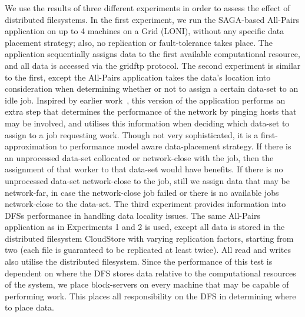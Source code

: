 \documentclass[a4paper,11pt]{article}
\begin{document}
We use the results of three different experiments in order to assess the effect of distributed filesystems. In the first experiment, we run the SAGA-based All-Pairs application on up to 4 machines on a Grid (LONI), without any specific data placement strategy; also, no replication or fault-tolerance takes place. The application sequentially assigns data to the first available computational resource, and all data is accessed via the gridftp protocol. The second experiment is similar to the first, except the All-Pairs application takes the data's location into consideration when determining whether or not to assign a certain data-set to an idle job. Inspired by earlier work~\cite{netperf}, this version of the application performs an extra step that determines the performance of the network by pinging hosts that may be involved, and utilises this information when deciding which data-set to assign to a job requesting work. Though not very sophisticated, it is a first-approximation to performance model aware data-placement strategy.  If there is an unprocessed data-set collocated or network-close with the job, then the assignment of that worker to that data-set would have benefits. If there is no unprocessed data-set network-close to the job, still we assign data that may be network-far, in case the network-close job failed or there is no available jobs network-close to the data-set. The third experiment provides information into DFSs performance in handling data locality issues. The same All-Pairs application as in Experiments 1 and 2 is used, except all data is stored in the distributed filesystem CloudStore with varying replication factors, starting from two (each file is guaranteed to be replicated at least twice). All read and writes also utilise the distributed filesystem. Since the performance of this test is dependent on where the DFS stores data relative to the computational resources of the system, we place block-servers on every machine that may be capable of performing work. This places all responsibility on the DFS in determining where to place data.
\end{document}
